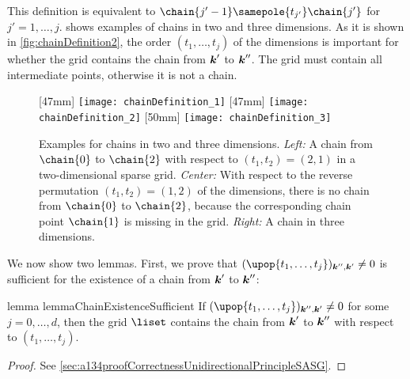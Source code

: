 This definition is equivalent to
$\chain{j'-1} \samepole{t_{j'}} \chain{j'}$ for $j' = 1, \dotsc, j$.
 shows examples of chains in
two and three dimensions.
As it is shown in \cref{fig:chainDefinition2},
the order $(t_1, \dotsc, t_j)$ of the dimensions is important
for whether the grid contains the chain from ${\boldsymbol{k}}'$ to ${\boldsymbol{k}}''$.
The grid must contain all intermediate points, otherwise
it is not a chain.

\begin{figure}
  [47mm]{%
    \texttt{[image: chainDefinition\_1]}%
  }%
  \hfill%
  [47mm]{%
    \texttt{[image: chainDefinition\_2]}%
  }%
  \hfill%
  [50mm]{%
    \texttt{[image: chainDefinition\_3]}%
  }%
  \caption[%
    Examples for the definition of chains%
  ]{%
    Examples for chains in two and three dimensions.
    \emph{Left:} A chain from $\chain{0}$ to $\chain{2}$
    with respect to $(t_1, t_2) = (2, 1)$ in a two-dimensional sparse grid.
    \emph{Center:}
    With respect to the reverse permutation
    $(t_1, t_2) = (1, 2)$ of the dimensions,
    there is no chain from $\chain{0}$ to $\chain{2}$,
    because the corresponding chain point $\chain{1}$ is missing in the grid.
    \emph{Right:} A chain in three dimensions.%
  }%
  \label{fig:chainDefinition}%
\end{figure}

We now show two lemmas.
First, we prove that $(\upop{t_1,\dotsc,t_j})_{\*k'',\*k'} \not= 0$
is sufficient for the existence of a chain from ${\boldsymbol{k}}'$ to ${\boldsymbol{k}}''$:

\begin{restatable}{%
  lemma%
}{%
  lemmaChainExistenceSufficient%
}
  \label{lemma:chainExistenceSufficient}
  If $(\upop{t_1,\dotsc,t_j})_{\*k'',\*k'} \not= 0$
  for some $j = 0, \dotsc, d$,
  then the grid $\liset$ contains the chain from ${\boldsymbol{k}}'$ to ${\boldsymbol{k}}''$
  with respect to $(t_1, \dotsc, t_j)$.
\end{restatable}

\vspace{-0.5em}

\begin{proof}
  See \cref{sec:a134proofCorrectnessUnidirectionalPrincipleSASG}.
\end{proof}

\vspace{0.5em}

